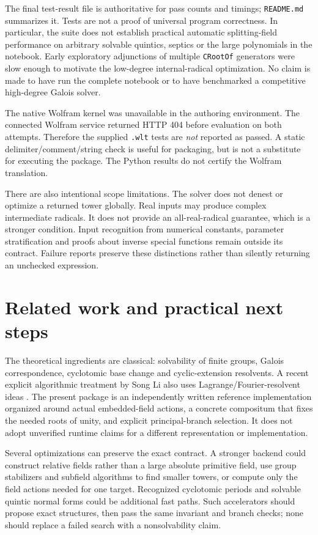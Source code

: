 \documentclass[11pt,letterpaper]{article}
\newcommand{\code}[1]{\texttt{#1}}
\theoremstyle{definition}\newtheorem{definition}[theorem]{Definition}
\theoremstyle{remark}\newtheorem{remark}[theorem]{Remark}
\begin{document}
The final test-result file is authoritative for pass counts and timings;
\code{README.md} summarizes it. Tests are not a proof of universal program
correctness. In particular, the suite does not establish practical automatic
splitting-field performance on arbitrary solvable quintics, septics or the
large polynomials in the notebook. Early exploratory adjunctions of multiple
\code{CRootOf} generators were slow enough to motivate the low-degree
internal-radical optimization. No claim is made to have run the complete
notebook or to have benchmarked a competitive high-degree Galois solver.

The native Wolfram kernel was unavailable in the authoring environment.
The connected Wolfram service returned HTTP 404 before evaluation on both
attempts. Therefore the supplied \code{.wlt} tests are \emph{not} reported as
passed. A static delimiter/comment/string check is useful for packaging,
but is not a substitute for executing the package. The Python results do
not certify the Wolfram translation.

There are also intentional scope limitations. The solver does not denest
or optimize a returned tower globally. Real inputs may produce complex
intermediate radicals. It does not provide an all-real-radical guarantee,
which is a stronger condition. Input recognition from numerical constants,
parameter stratification and proofs about inverse special functions remain
outside its contract. Failure reports preserve these distinctions rather
than silently returning an unchecked expression.

\section{Related work and practical next steps}

The theoretical ingredients are classical: solvability of finite groups,
Galois correspondence, cyclotomic base change and cyclic-extension
resolvents. A recent explicit algorithmic treatment by Song Li also uses
Lagrange/Fourier-resolvent ideas \cite{li}. The present package is an
independently written reference implementation organized around actual
embedded-field actions, a concrete compositum that fixes the needed roots
of unity, and explicit principal-branch selection. It does not adopt
unverified runtime claims for a different representation or implementation.

Several optimizations can preserve the exact contract. A stronger backend
could construct relative fields rather than a large absolute primitive
field, use group stabilizers and subfield algorithms to find smaller towers,
or compute only the field actions needed for one target. Recognized
cyclotomic periods and solvable quintic normal forms could be additional
fast paths. Such accelerators should propose exact structures, then pass the
same invariant and branch checks; none should replace a failed search with
a nonsolvability claim.
\end{document}
